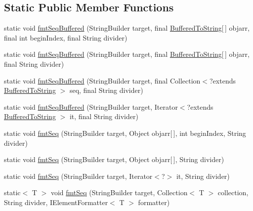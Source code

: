 \subsection*{Static Public Member Functions}
\begin{DoxyCompactItemize}
\item 
static void \hyperlink{classorg_1_1tzi_1_1use_1_1util_1_1_string_util_ac35c33fcbb7e89d7a77353b50acb451e}{fmt\-Seq\-Buffered} (String\-Builder target, final \hyperlink{interfaceorg_1_1tzi_1_1use_1_1util_1_1_buffered_to_string}{Buffered\-To\-String}\mbox{[}$\,$\mbox{]} objarr, final int begin\-Index, final String divider)
\item 
static void \hyperlink{classorg_1_1tzi_1_1use_1_1util_1_1_string_util_a2b8fc699c3ee708a46c8f542396d4d2b}{fmt\-Seq\-Buffered} (String\-Builder target, final \hyperlink{interfaceorg_1_1tzi_1_1use_1_1util_1_1_buffered_to_string}{Buffered\-To\-String}\mbox{[}$\,$\mbox{]} objarr, final String divider)
\item 
static void \hyperlink{classorg_1_1tzi_1_1use_1_1util_1_1_string_util_a91a4d093498cb7317f7eee08cbfc3ecc}{fmt\-Seq\-Buffered} (String\-Builder target, final Collection$<$?extends \hyperlink{interfaceorg_1_1tzi_1_1use_1_1util_1_1_buffered_to_string}{Buffered\-To\-String} $>$ seq, final String divider)
\item 
static void \hyperlink{classorg_1_1tzi_1_1use_1_1util_1_1_string_util_aa23e928e5e9d9bd06b9a64cfa2352426}{fmt\-Seq\-Buffered} (String\-Builder target, Iterator$<$?extends \hyperlink{interfaceorg_1_1tzi_1_1use_1_1util_1_1_buffered_to_string}{Buffered\-To\-String} $>$ it, final String divider)
\item 
static void \hyperlink{classorg_1_1tzi_1_1use_1_1util_1_1_string_util_a416e55b8b95476ab78e66839d065e0ad}{fmt\-Seq} (String\-Builder target, Object objarr\mbox{[}$\,$\mbox{]}, int begin\-Index, String divider)
\item 
static void \hyperlink{classorg_1_1tzi_1_1use_1_1util_1_1_string_util_abc06a22dd562e6fb8f4b5621741c020a}{fmt\-Seq} (String\-Builder target, Object objarr\mbox{[}$\,$\mbox{]}, String divider)
\item 
static void \hyperlink{classorg_1_1tzi_1_1use_1_1util_1_1_string_util_a8c29ae181f13a47adfd5709aa5c86b7f}{fmt\-Seq} (String\-Builder target, Iterator$<$?$>$ it, String divider)
\item 
static$<$ T $>$ void \hyperlink{classorg_1_1tzi_1_1use_1_1util_1_1_string_util_a30f2f0c28f97e3cae68a09f2a630c373}{fmt\-Seq} (String\-Builder target, Collection$<$ T $>$ collection, String divider, I\-Element\-Formatter$<$ T $>$ formatter)

\end{DoxyCompactItemize}
